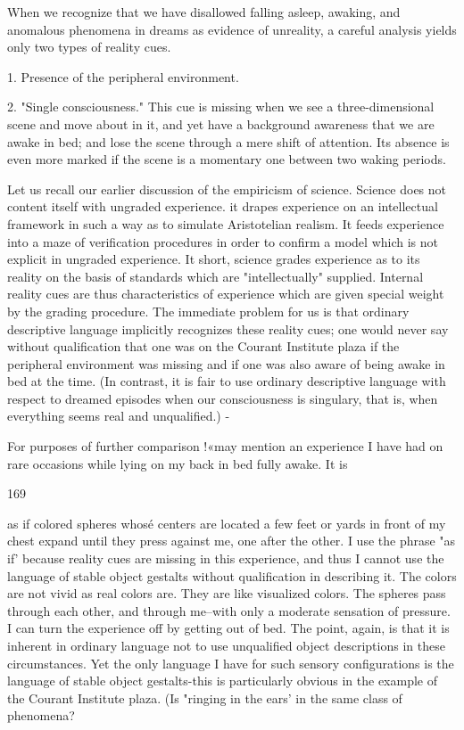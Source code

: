 \documentclass[10pt,twoside]{memoir}
\begin{document}
\begin{enumerate}
{{When we recognize that we have disallowed falling asleep, awaking, and 
anomalous phenomena in dreams as evidence of unreality, a careful analysis 
yields only two types of reality cues. 

1. Presence of the peripheral environment. 

2. "Single consciousness." This cue is missing when we see a 
three-dimensional scene and move about in it, and yet have a background 
awareness that we are awake in bed; and lose the scene through a mere shift 
of attention. Its absence is even more marked if the scene is a momentary 
one between two waking periods. 

Let us recall our earlier discussion of the empiricism of science. Science 
does not content itself with ungraded experience. it drapes experience on an 
intellectual framework in such a way as to simulate Aristotelian realism. It 
feeds experience into a maze of verification procedures in order to confirm a 
model which is not explicit in ungraded experience. It short, science grades 
experience as to its reality on the basis of standards which are 
"intellectually" supplied. Internal reality cues are thus characteristics of 
experience which are given special weight by the grading procedure. The 
immediate problem for us is that ordinary descriptive language implicitly 
recognizes these reality cues; one would never say without qualification that 
one was on the Courant Institute plaza if the peripheral environment was 
missing and if one was also aware of being awake in bed at the time. (In 
contrast, it is fair to use ordinary descriptive language with respect to 
dreamed episodes when our consciousness is singulary, that is, when 
everything seems real and unqualified.) - 

For purposes of further comparison !«may mention an experience I 
have had on rare occasions while lying on my back in bed fully awake. It is 


169 


as if colored spheres whosé centers are located a few feet or yards in front of 
my chest expand until they press against me, one after the other. I use the 
phrase "as if' because reality cues are missing in this experience, and thus I 
cannot use the language of stable object gestalts without qualification in 
describing it. The colors are not vivid as real colors are. They are like 
visualized colors. The spheres pass through each other, and through me--with 
only a moderate sensation of pressure. I can turn the experience off by 
getting out of bed. The point, again, is that it is inherent in ordinary 
language not to use unqualified object descriptions in these circumstances. 
Yet the only language I have for such sensory configurations is the language 
of stable object gestalts-this is particularly obvious in the example of the 
Courant Institute plaza. (Is "ringing in the ears' in the same class of 
phenomena? } 

}
\end{enumerate}
\end{document}
